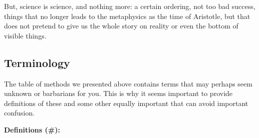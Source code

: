But, science is science, and nothing more: a certain ordering, not too bad success, things that no longer leads to the metaphysics as the time of Aristotle, but that does not pretend to give us the whole story on reality or even the bottom of visible things.

	\pagebreak
	\subsection{Terminology}

The table of methods we presented above contains terms that may perhaps seem unknown or barbarians for you. This is why it seems important to provide definitions of these and some other equally important that can avoid important confusion. 

\textbf{Definitions (\#\mydef):}


